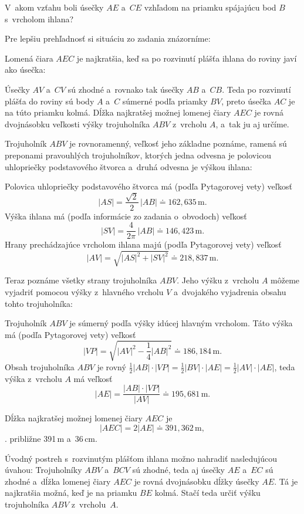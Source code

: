 {%
\napad
V~akom vzťahu boli úsečky $AE$ a~$CE$ vzhľadom na priamku spájajúcu bod $B$ s~vrcholom ihlana?

\riesenie
Pre lepšiu prehľadnosť si situáciu zo zadania znázorníme:
%


Lomená čiara $AEC$ je najkratšia, keď sa po rozvinutí plášťa ihlana do roviny javí ako úsečka:
%


Úsečky $AV$ a~$CV$ sú zhodné a~rovnako tak úsečky $AB$ a~$CB$.
Teda po rozvinutí plášťa do roviny sú body $A$ a~$C$ súmerné podľa priamky $BV$, preto úsečka $AC$ je na túto priamku kolmá.
Dĺžka najkratšej možnej lomenej čiary $AEC$ je rovná dvojnásobku veľkosti výšky trojuholníka $ABV$ z~vrcholu $A$, a~tak ju aj určíme.

Trojuholník $ABV$ je rovnoramenný, veľkosť jeho základne poznáme, ramená sú preponami pravouhlých trojuholníkov, ktorých jedna odvesna je polovicou uhlopriečky podstavového štvorca a~druhá odvesna je výškou ihlana:
%


\noindent
Polovica uhlopriečky podstavového štvorca má (podľa Pytagorovej vety) veľkosť
$$
|AS|=\frac{\sqrt2}2\,|AB| \doteq 162{,}635\,\text{m}.
$$
Výška ihlana má (podľa informácie zo zadania o~obvodoch) veľkosť
$$
|SV|=\frac{4}{2\pi}\,|AB| \doteq 146{,}423\,\text{m}.
$$
Hrany prechádzajúce vrcholom ihlana majú (podľa Pytagorovej vety) veľkosť
$$
|AV|=\sqrt{|AS|^2+|SV|^2} \doteq 218{,}837\,\text{m}.
$$

Teraz poznáme všetky strany trojuholníka $ABV$.
Jeho výšku z~vrcholu $A$ môžeme vyjadriť pomocou výšky z~hlavného vrcholu $V$ a~dvojakého vyjadrenia obsahu tohto trojuholníka:
%


Trojuholník $ABV$ je súmerný podľa výšky idúcej hlavným vrcholom.
Táto výška má (podľa Pytagorovej vety) veľkosť
$$
|VP|=\sqrt{|AV|^2-\frac14|AB|^2} \doteq 186{,}184\,\text{m}.
$$
Obsah trojuholníka $ABV$ je rovný $\frac12|AB|\cdot|VP|=\frac12|BV|\cdot|AE|=\frac12|AV|\cdot|AE|$, teda výška z~vrcholu $A$ má veľkosť
$$
|AE|=\frac{|AB|\cdot|VP|}{|AV|} \doteq 195{,}681\,\text{m}.
$$

Dĺžka najkratšej možnej lomenej čiary $AEC$ je
$$
|AEC|=2|AE| \doteq 391{,}362\,\text{m},
$$
\tj. približne 391\,m a~36\,cm.


\poznamky
Úvodný postreh s~rozvinutým plášťom ihlana možno nahradiť nasledujúcou úvahou:
Trojuholníky $ABV$ a~$BCV$ sú zhodné, teda aj úsečky $AE$ a~$EC$ sú zhodné a~dĺžka lomenej čiary $AEC$ je rovná dvojnásobku dĺžky úsečky $AE$.
Tá je najkratšia možná, keď je na priamku $BE$ kolmá.
Stačí teda určiť výšku trojuholníka $ABV$ z~vrcholu~$A$.

}
